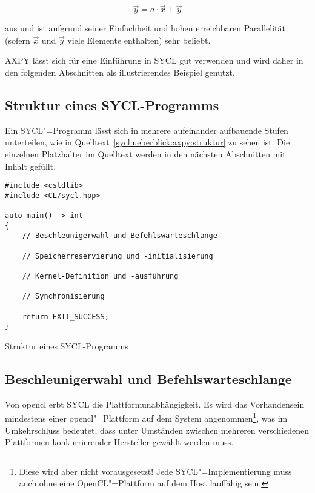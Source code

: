 \begin{equation}\label{sycl:ueberblick:axpy:formel}
    \vec{y} = a \cdot \vec{x} + \vec{y}
\end{equation}

aus und ist aufgrund seiner Einfachheit und hohen erreichbaren Parallelität
(sofern $\vec{x}$ und $\vec{y}$ viele Elemente enthalten) sehr beliebt.

AXPY lässt sich für eine Einführung in SYCL gut verwenden und wird daher in den
folgenden Abschnitten als illustrierendes Beispiel genutzt.

\subsection{Struktur eines SYCL-Programms}

Ein SYCL"=Programm lässt sich in mehrere aufeinander aufbauende Stufen
unterteilen, wie in Quelltext~\ref{sycl:ueberblick:axpy:struktur} zu sehen ist.
Die einzelnen Platzhalter im Quelltext werden in den nächsten Abschnitten mit
Inhalt gefüllt.

\begin{code}
    \begin{verbatim}
#include <cstdlib>
#include <CL/sycl.hpp>

auto main() -> int
{
    // Beschleunigerwahl und Befehlswarteschlange

    // Speicherreservierung und -initialisierung

    // Kernel-Definition und -ausführung

    // Synchronisierung

    return EXIT_SUCCESS;
}
    \end{verbatim}
    \caption{Struktur eines SYCL-Programms}
    \label{sycl:ueberblick:axpy:struktur}
\end{code}

\subsection{Beschleunigerwahl und Befehlswarteschlange}
\label{sycl:ueberblick:axpy:queue}

Von \gls{opencl} erbt SYCL die Plattformunabhängigkeit. Es wird das
Vorhandensein mindestens einer \gls{opencl}"=Plattform auf dem System
angenommen\footnote{Diese wird aber nicht vorausgesetzt! Jede
SYCL"=Implementierung muss auch ohne eine OpenCL"=Plattform auf dem Host
lauffähig sein.}, was im Umkehrschluss bedeutet, dass unter Umständen zwischen
mehreren verschiedenen Plattformen konkurrierender Hersteller gewählt werden
muss. 

